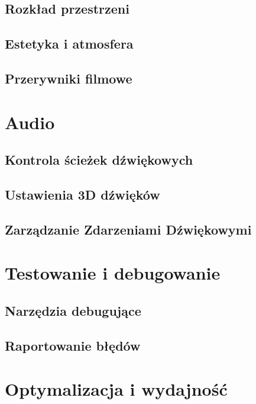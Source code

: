 \documentclass[12pt]{Tech}
\begin{document}
\subsection{Rozkład przestrzeni}

\subsection{Estetyka i atmosfera}\label{sec:aesthetics}

\subsection{Przerywniki filmowe}

\newpage

\section{Audio}\label{sec:audio}

\subsection{Kontrola ścieżek dźwiękowych}

\subsection{Ustawienia 3D dźwięków}

\subsection{Zarządzanie Zdarzeniami Dźwiękowymi}


\newpage

\section{Testowanie i debugowanie}\label{sec:test}

\subsection{Narzędzia debugujące}

\subsection{Raportowanie błędów}


\newpage

\section{Optymalizacja i wydajność}\label{sec:opt}

\end{document}
